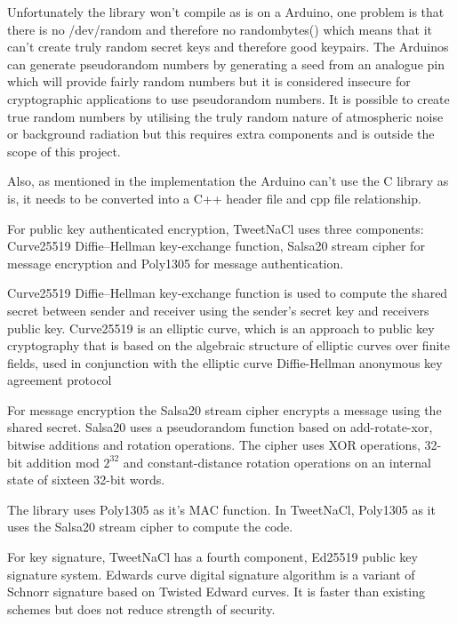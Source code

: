 Unfortunately the library won't compile as is on a Arduino, one problem is that there is no /dev/random and therefore no randombytes() which means that it can't create truly random secret keys and therefore good keypairs. The Arduinos can generate pseudorandom numbers by generating a seed from an analogue pin which will provide fairly random numbers but it is considered insecure for cryptographic applications to use pseudorandom numbers\cite{arduinopseudo}. It is possible to create true random numbers by utilising the truly random nature of atmospheric noise or background radiation but this requires extra components and is outside the scope of this project. 

Also, as mentioned in the implementation the Arduino can't use the C library as is, it needs to be converted into a C++ header file and cpp file relationship.

For public key authenticated encryption, TweetNaCl uses three components: Curve25519 Diffie–Hellman key-exchange function, Salsa20 stream cipher for message encryption and Poly1305 for message authentication. 

Curve25519 Diffie–Hellman key-exchange function is used to compute the shared secret between sender and receiver using the sender's secret key and receivers public key. Curve25519 is an elliptic curve, which is an approach to public key cryptography that is based on the algebraic structure of elliptic curves over finite fields, used in conjunction with the elliptic curve Diffie-Hellman anonymous key agreement protocol\cite{curve}

For message encryption the Salsa20 stream cipher encrypts a message using the shared secret. Salsa20 uses a pseudorandom function based on add-rotate-xor, bitwise additions and rotation operations. The cipher uses XOR operations, 32-bit addition mod $2^{32}$ and constant-distance rotation operations on an internal state of sixteen 32-bit words\cite{salsa}.

The library uses Poly1305 as it's MAC function. In TweetNaCl, Poly1305 as it uses the Salsa20 stream cipher to compute the code\cite{poly}.

For key signature, TweetNaCl has a fourth component, Ed25519 public key signature system. Edwards curve digital signature algorithm is a variant of Schnorr signature based on Twisted Edward curves. It is faster than existing schemes but does not reduce strength of security\cite{ed25}. 


